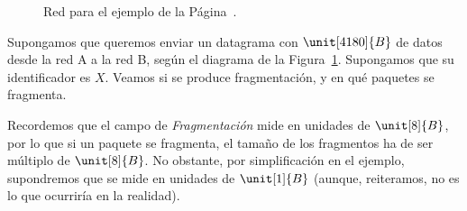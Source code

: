 \begin{ejemplo}\label{ejemplo:fragmentacion}
    \begin{figure}
        \centering
        \caption{Red para el ejemplo de la Página~\pageref{ejemplo:fragmentacion}.}
        \label{fig:fragmentacion}
    \end{figure}

    Supongamos que queremos enviar un datagrama con $\unit[4180]{B}$ de datos desde la red A a la red B, según el diagrama de la Figura~\ref{fig:fragmentacion}. Supongamos que su identificador es $X$. Veamos si se produce fragmentación, y en qué paquetes se fragmenta.
    \begin{observacion}
        Recordemos que el campo de \emph{Fragmentación} mide en unidades de $\unit[8]{B}$, por lo que si un paquete se fragmenta, el tamaño de los fragmentos ha de ser múltiplo de $\unit[8]{B}$. No obstante, por simplificación en el ejemplo, supondremos que se mide en unidades de $\unit[1]{B}$ (aunque, reiteramos, no es lo que ocurriría en la realidad).
    \end{observacion}


\end{ejemplo}

